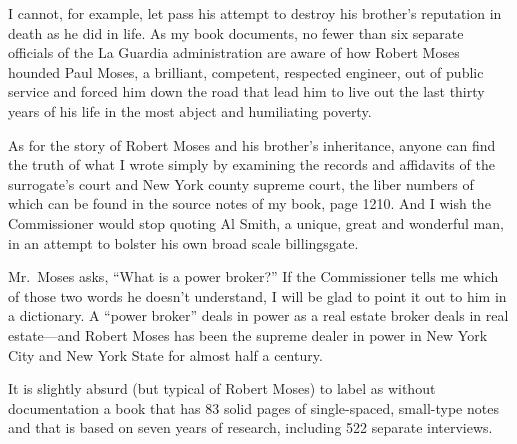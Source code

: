 \documentclass[11pt,letterpaper]{article}
\begin{document}
I cannot, for example, let pass his attempt to destroy his brother's reputation in death as he did in life. As my book documents, no fewer than six separate officials of the La Guardia administration are aware of how Robert Moses hounded Paul Moses, a brilliant, competent, respected engineer, out of public service and forced him down the road that lead him to live out the last thirty years of his life in the most abject and humiliating poverty.

As for the story of Robert Moses and his brother's inheritance, anyone can find the truth of what I wrote simply by examining the records and affidavits of the surrogate's court and New York county supreme court, the liber numbers of which can be found in the source notes of my book, page 1210. And I wish the Commissioner would stop quoting Al Smith, a unique, great and wonderful man, in an attempt to bolster his own broad scale billingsgate.

Mr.\ Moses asks, \enquote{What is a power broker?} If the Commissioner tells me which of those two words he doesn't understand, I will be glad to point it out to him in a dictionary. A \enquote{power broker} deals in power as a real estate broker deals in real estate---and Robert Moses has been the supreme dealer in power in New York City and New York State for almost half a century.

It is slightly absurd (but typical of Robert Moses) to label as without documentation a book that has 83 solid pages of single-spaced, small-type notes and that is based on seven years of research, including 522 separate interviews.
\end{document}
